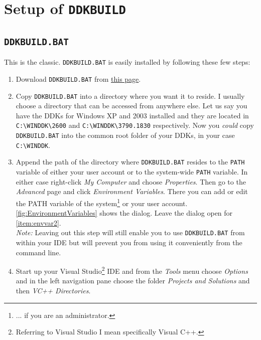 \documentclass[a4paper,titlepage]{report}
\newcommand{\linkclr}[1]{\textcolor[rgb]{0.00,0.00,0.60}{#1}}
\newcommand{\extlink}[2]{\href{#1}{\linkclr{#2}}}
\begin{document}
\chapter{Setup of \texttt{DDKBUILD}}\thispagestyle{fancy}
\section{\texttt{DDKBUILD.BAT}}
\label{sec:batchversion}
This is the classic. \texttt{DDKBUILD.BAT} is easily installed by following these
few steps:
\begin{enumerate}
  \item
    Download \texttt{DDKBUILD.BAT} from \extlink{http://www.osronline.com/article.cfm?article=43}{this page}.
  \item
    Copy \texttt{DDKBUILD.BAT} into a directory where you want it to reside. I usually
    choose a directory that can be accessed from anywhere else. Let us say you have
    the DDKs for Windows XP and 2003 installed and they are located in \verb+C:\WINDDK\2600+
    and \verb+C:\WINDDK\3790.1830+ respectively. Now you \emph{could} copy \texttt{DDKBUILD.BAT}
    into the common root folder of your DDKs, in your case \verb+C:\WINDDK+.
  \item \label{item:envvar1}
    Append the path of the directory where \texttt{DDKBUILD.BAT} resides to the \texttt{PATH}
    variable of either your user account or to the system-wide \texttt{PATH} variable. In
    either case right-click \emph{My Computer} and choose \emph{Properties}. Then go to the
    \emph{Advanced} page and click \emph{Environment Variables}. There you can add or edit
    the PATH variable of the system\footnote{... if you are an administrator.} or your user
    account.
    \autoref{fig:EnvironmentVariables} shows the dialog. Leave the dialog open for
    \autoref{item:envvar2}.\\
    \emph{Note:} Leaving out this step will still enable you to use \texttt{DDKBUILD.BAT} from
    within your IDE but will prevent you from using it conveniently from the command line.
  \item
    Start up your Visual Studio\footnote{Referring to Visual Studio I mean specifically
    Visual C++.} IDE and from the \emph{Tools} menu choose \emph{Options} and in the left
    navigation pane choose the folder \emph{Projects and Solutions} and then \emph{VC++ Directories}.

\end{enumerate}
\end{document}
